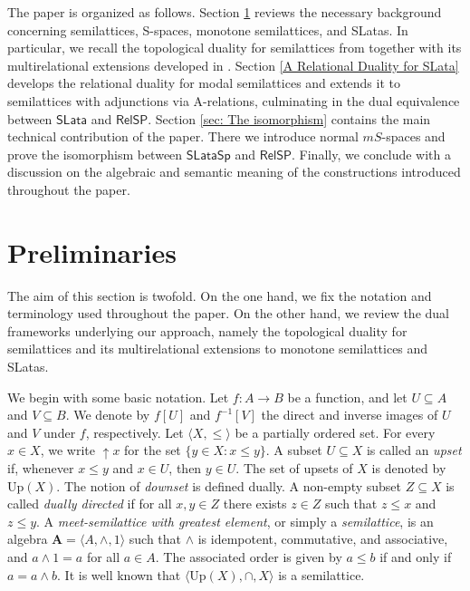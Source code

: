 \documentclass{article}
\begin{document}
The paper is organized as follows. Section \ref{Preliminaries} reviews the necessary background concerning semilattices, S-spaces, monotone semilattices, and SLatas. In particular, we recall the topological duality for semilattices from \cite{CG} together with its multirelational extensions developed in \cite{P W,GPZ}. Section \ref{A Relational Duality for SLata} develops the relational duality for modal semilattices and extends it to semilattices with adjunctions via A-relations, culminating in the dual equivalence between $\mathsf{SLata}$ and $\mathsf{RelSP}$. Section \ref{sec: The isomorphism} contains the main technical contribution of the paper. There we introduce normal $mS$-spaces and prove the isomorphism between $\mathsf{SLataSp}$ and $\mathsf{RelSP}$. Finally, we conclude with a discussion on the algebraic and semantic meaning of the constructions introduced throughout the paper.


\section{Preliminaries}\label{Preliminaries}
The aim of this section is twofold. On the one hand, we fix the notation and terminology used throughout the paper. On the other hand, we review the dual frameworks underlying our approach, namely the topological duality for semilattices and its multirelational extensions to monotone semilattices and SLatas.
\medskip

We begin with some basic notation. Let $f:A\to B$ be a function, and let $U\subseteq A$ and $V\subseteq B$. We denote by $f[U]$ and $f^{-1}[V]$ the direct and inverse images of $U$ and $V$ under $f$, respectively. Let $\langle X, \leq\rangle$ be a partially ordered set. For every $x \in X$, we write $\uparrow x$ for the set $\{y \in X : x \leq y\}$. A subset $U \subseteq X$ is called an \emph{upset} if, whenever $x \leq y$ and $x \in U$, then $y \in U$. The set of upsets of $X$ is denoted by $\mathrm{Up}(X)$. The notion of \emph{downset} is defined dually. A non-empty subset $Z \subseteq X$ is called \emph{dually directed} if for all $x,y \in Z$ there exists $z \in Z$ such that $z \leq x$ and $z \leq y$. A \emph{meet-semilattice with greatest element}, or simply a \emph{semilattice}, is an algebra $\mathbf{A} = \langle A, \wedge, 1 \rangle$ such that $\wedge$ is idempotent, commutative, and associative, and $a \wedge 1 = a$ for all $a \in A$. The associated order is given by $a \leq b$ if and only if $a = a \wedge b$. It is well known that $\langle \mathrm{Up}(X), \cap, X\rangle$ is a semilattice.
\end{document}
